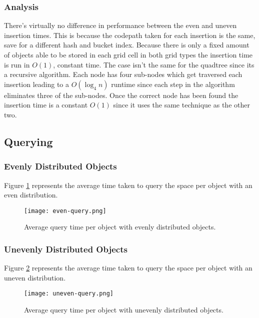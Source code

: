 \documentclass[a4paper, 12pt]{article}
\begin{document}
\subsubsection{Analysis}
There's virtually no difference in performance between the even and uneven
insertion times. This is because the codepath taken for each insertion is the
same, save for a different hash and bucket index. Because there is only a fixed
amount of objects able to be stored in each grid cell in both grid types the
insertion time is run in $O(1)$, constant time. The case isn't the same for the
quadtree since its a recursive algorithm. Each node has four sub-nodes which get
traversed each insertion leading to a $O(\log_4 n)$ runtime since each step in
the algorithm eliminates three of the sub-nodes. Once the correct node has been
found the insertion time is a constant $O(1)$ since it uses the same technique
as the other two.

\subsection{Querying}

\subsubsection{Evenly Distributed Objects}
Figure \ref{fig:even-query} represents the average time taken to query the space
per object with an even distribution.
\begin{figure}[H]
    \centering
    \caption{Average query time per object with evenly distributed objects.}
    \texttt{[image: even-query.png]}
    \label{fig:even-query}
\end{figure}

\subsubsection{Unevenly Distributed Objects}
Figure \ref{fig:uneven-query} represents the average time taken to query the space
per object with an uneven distribution.
\begin{figure}[H]
    \centering
    \caption{Average query time per object with unevenly distributed objects.}
    \texttt{[image: uneven-query.png]}
    \label{fig:uneven-query}
\end{figure}
\end{document}
